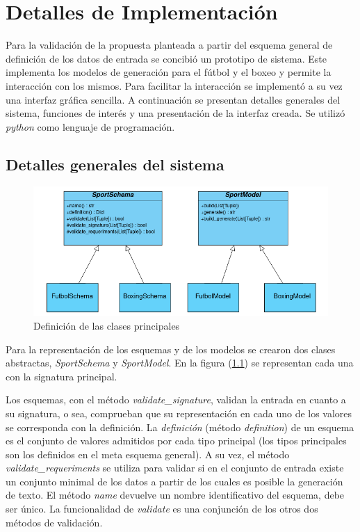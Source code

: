 \chapter{Detalles de Implementación}\label{chapter:implementation}

Para la validación de la propuesta planteada a partir del esquema general de definición de los datos de entrada se concibió 
un prototipo de sistema. Este implementa los modelos de generación para el fútbol y el boxeo y permite la interacción
 con los mismos. Para facilitar la interacción se implementó a su vez una interfaz gráfica sencilla. A continuación se presentan 
 detalles generales del sistema, funciones de interés y una presentación de la interfaz creada. Se utilizó \emph{python} como 
 lenguaje de programación.
 
\section{Detalles generales del sistema}

\begin{figure}[!]
    \begin{center}
        \includegraphics[width=\textwidth]{Graphics/classDef3.png}
    \end{center}
    \caption{Definición de las clases principales}
    \label{fig_classDef}
\end{figure}

Para la representación de los esquemas y de los modelos se crearon dos clases abstractas, \textit{SportSchema} y 
\textit{SportModel}. En la figura (\ref{fig_classDef}) se representan cada una con la signatura principal. 

Los esquemas, con el m\'etodo \emph{validate\_signature}, validan la entrada en cuanto a su signatura, o sea, comprueban que 
su representación en cada uno de los valores se corresponda con la definición. La \textit{definición} (m\'etodo \emph{definition}) 
de un esquema es el conjunto de valores admitidos por cada tipo principal (los tipos principales son los definidos en el 
meta esquema general). A su vez, el método \emph{validate\_requeriments} se utiliza para validar si en el conjunto de entrada
 existe un conjunto minimal de los datos a partir de los cuales es posible la generación de texto. El m\'etodo \emph{name} devuelve 
 un nombre identificativo del esquema, debe ser único. La funcionalidad de \emph{validate} es una conjunción de los otros dos 
 métodos de validación. 




